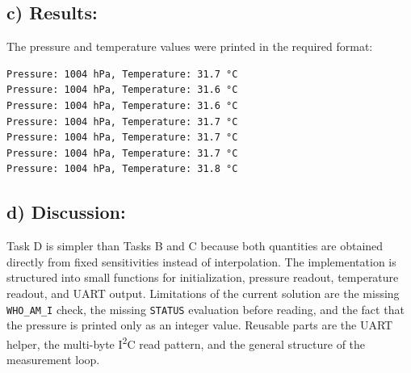 \subsection{c) Results:}

The pressure and temperature values were printed in the required format:

\begin{lstlisting}[caption={UART output of Task D}]
Pressure: 1004 hPa, Temperature: 31.7 °C
Pressure: 1004 hPa, Temperature: 31.6 °C
Pressure: 1004 hPa, Temperature: 31.6 °C
Pressure: 1004 hPa, Temperature: 31.7 °C
Pressure: 1004 hPa, Temperature: 31.7 °C
Pressure: 1004 hPa, Temperature: 31.7 °C
Pressure: 1004 hPa, Temperature: 31.8 °C
\end{lstlisting}

\subsection{d) Discussion:}

Task D is simpler than Tasks B and C because both quantities are obtained directly from fixed sensitivities instead of interpolation. The implementation is structured into small functions for initialization, pressure readout, temperature readout, and UART output. Limitations of the current solution are the missing \texttt{WHO\_AM\_I} check, the missing \texttt{STATUS} evaluation before reading, and the fact that the pressure is printed only as an integer value. Reusable parts are the UART helper, the multi-byte I\textsuperscript{2}C read pattern, and the general structure of the measurement loop.
